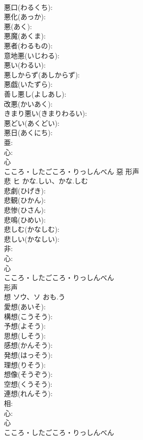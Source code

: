 \documentclass[8pt]{extreport}
\begin{document}
\begin{CJK}{UTF8}{min}
\\	悪口(わるくち): 
\\	悪化(あっか): 
\\	悪(あく): 
\\	悪魔(あくま): 
\\	悪者(わるもの): 
\\	意地悪(いじわる): 
\\	悪い(わるい): 
\\	悪しからず(あしからず): 
\\	悪戯(いたずら): 
\\	善し悪し(よしあし): 
\\	改悪(かいあく): 
\\	きまり悪い(きまりわるい): 
\\	悪どい(あくどい): 
\\	悪日(あくにち): 
\\	亜: 
\\	心: 
\\	心	
\\	こころ・したごころ・りっしんべん	惡	形声 
\\	悲	ヒ	かな.しい、かな.しむ		
\\	悲劇(ひげき): 
\\	悲観(ひかん): 
\\	悲惨(ひさん): 
\\	悲鳴(ひめい): 
\\	悲しむ(かなしむ): 
\\	悲しい(かなしい): 
\\	非: 
\\	心: 
\\	心	
\\	こころ・したごころ・りっしんべん	
\\	形声 
\\	想	ソウ、ソ	おも.う		
\\	愛想(あいそ): 
\\	構想(こうそう): 
\\	予想(よそう): 
\\	思想(しそう): 
\\	感想(かんそう): 
\\	発想(はっそう): 
\\	理想(りそう): 
\\	想像(そうぞう): 
\\	空想(くうそう): 
\\	連想(れんそう): 
\\	相: 
\\	心: 
\\	心	
\\	こころ・したごころ・りっしんべん	

\end{CJK}
\end{document}
